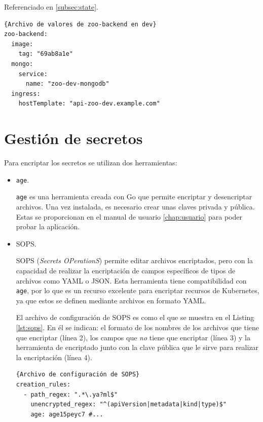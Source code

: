 Referenciado en \ref{subsec:state}.

\begin{lstlisting}[label=lst:values]{Archivo de valores de zoo-backend en dev}
zoo-backend:
  image:
    tag: "69ab8a1e"
  mongo:
    service:
      name: "zoo-dev-mongodb"
  ingress:
    hostTemplate: "api-zoo-dev.example.com"
\end{lstlisting}

\clearpage

\section{Gestión de secretos}
\label{sec:secrets}

Para encriptar los secretos se utilizan dos herramientas:

\begin{itemize}
  \item \texttt{age}\cite{age}.

    \texttt{age} es una herramienta creada con Go que permite encriptar y desencriptar archivos. Una vez instalada, es necesario crear unas claves privada y pública. Estas se proporcionan en el manual de usuario \ref{chap:usuario} para poder probar la aplicación.
  \item SOPS\cite{sops}.

    SOPS (\textit{Secrets OPerationS}) permite editar archivos encriptados, pero con la capacidad de realizar la encriptación de campos específicos de tipos de archivos como YAML o JSON. Esta herramienta tiene compatibilidad con \texttt{age}, por lo que es un recurso excelente para encriptar recursos de Kubernetes, ya que estos se definen mediante archivos en formato YAML.

    El archivo de configuración de SOPS es como el que se muestra en el Listing \ref{lst:sops}. En él se indican: el formato de los nombres de los archivos que tiene que encriptar (línea 2), los campos que \textit{no} tiene que encriptar (línea 3) y la herramienta de encriptado junto con la clave pública que le sirve para realizar la encriptación (línea 4).

\begin{lstlisting}[language=helm,label=lst:sops]{Archivo de configuración de SOPS}
creation_rules:
  - path_regex: ".*\.ya?ml$"
    unencrypted_regex: "^(apiVersion|metadata|kind|type)$"
    age: age15peyc7 #...
\end{lstlisting}

\end{itemize}

